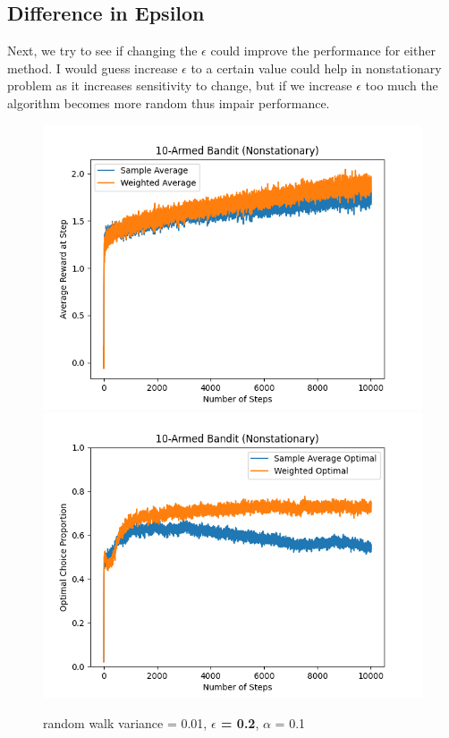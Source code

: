 \documentclass{article}
\begin{document}
\subsection{Difference in Epsilon}
Next, we try to see if changing the $\epsilon$ could improve the performance for either method. I would guess increase $\epsilon$ to a certain value could help in nonstationary problem as it increases sensitivity to change, but if we increase $\epsilon$ too much the algorithm becomes more random thus impair performance.

\begin{figure}[h!]
\centering
\includegraphics[scale=.6]{RL_A1_pics/epsilon/0.2.png}
\includegraphics[scale=.6]{RL_A1_pics/epsilon/optimal/0.2.png}
\caption{random walk variance = 0.01, \textbf{$\epsilon$ = 0.2}, $\alpha$ = 0.1}
\label{fig:10-Armed1}
\end{figure}
\end{document}
